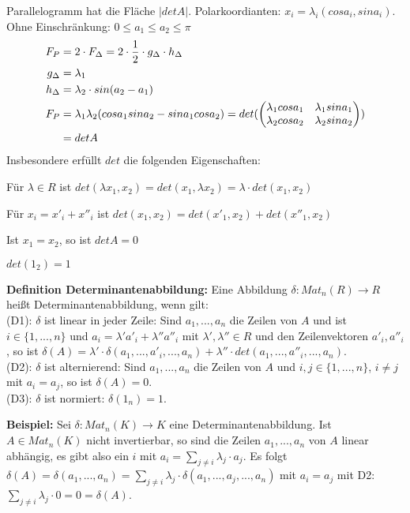 \documentclass[11pt]{article}
\begin{document}
		Parallelogramm hat die Fläche $|det A|$. Polarkoordianten: $x_i=\lambda_i(cos a_i, sin a_i)$. Ohne Einschränkung: $0\le a_1 \le a_2
		\le \pi$
		\begin{align}
			F_{P} &= 2\cdot F_{\Delta} = 2\cdot \frac 1 2 \cdot g_{\Delta} \cdot h_{\Delta} \notag \\
			g_{\Delta} &= \lambda_1 \notag \\
			h_{\Delta} &= \lambda_2 \cdot sin(a_2-a_1) \notag \\
			F_{P} &= \lambda_1\lambda_2(cos a_1 sin a_2 - sin a_1 cos a_2) = det(\begin{pmatrix}\lambda_1 cos a_1 & 
			\lambda_1 sin a_1 \\ \lambda_2 cos a_2 & \lambda_2 sin a_2 \end{pmatrix}) \notag \\
			&= det A \notag
		\end{align}
		Insbesondere erfüllt $det$ die folgenden Eigenschaften: 
		\begin{compactitem}
			\item Für $\lambda\in R$ ist $det(\lambda x_1,x_2)=det(x_1,\lambda x_2)=\lambda\cdot det(x_1,x_2)$
			\item Für $x_i=x'_i+x''_i$ ist $det(x_1,x_2)=det(x'_1,x_2) + det(x''_1,x_2)$
			\item Ist $x_1=x_2$, so ist $det A=0$
			\item $det(1_2)=1$
		\end{compactitem}
		
		\begin{mdframed}[backgroundcolor=blue!20]
			\textbf{Definition Determinantenabbildung:} Eine Abbildung $\delta:Mat_n(R)\to R$ heißt Determinantenabbildung, wenn gilt: \\
			(D1): $\delta$ ist linear in jeder Zeile: Sind $a_1,...,a_n$ die Zeilen von $A$ und ist $i\in \{1,...,n\}$ und $a_i=\lambda'a'_i + 
			\lambda''a''_i$ mit $\lambda',\lambda''\in R$ und den Zeilenvektoren $a'_i,a''_i$, so ist $\delta(A)=\lambda'\cdot \delta(a_1,...,
			a'_i,...,a_n) + \lambda''\cdot det(a_1,...,a''_i,...,a_n)$. \\
			(D2): $\delta$ ist alternierend: Sind $a_1,...,a_n$ die Zeilen von $A$ und $i,j\in \{1,...,n\}$, $i\neq j$ mit $a_i=a_j$, so ist 
			$\delta(A)=0$. \\
			(D3): $\delta$ ist normiert: $\delta(1_n)=1$.
		\end{mdframed}
		
		\textbf{Beispiel:} Sei $\delta:Mat_n(K)\to K$ eine Determinantenabbildung. Ist $A\in Mat_n(K)$ nicht invertierbar, so sind die Zeilen 
		$a_1,...,a_n$ von $A$ linear abhängig, es gibt also ein $i$ mit $a_i=\sum\limits_{j\neq i} \lambda_j\cdot a_j$. Es folgt $\delta(A)=
		\delta(a_1,...,a_n)=\sum\limits_{j\neq i} \lambda_j\cdot \delta(a_1,...,a_j,...,a_n)$ mit $a_i=a_j$ mit D2: $\sum\limits_{j\neq i} 
		\lambda_j\cdot 0=0=\delta(A)$.
		
\end{document}
